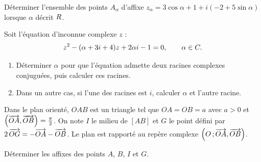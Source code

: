 \begin{annales}
Déterminer l'ensemble des points $A_{\alpha}$ d'affixe
$z_{\alpha} = 3\cos\alpha+1+i\left(-2+5\sin\alpha\right)$ lorsque $\alpha$
décrit $R$.

Soit l'équation d'inconnue complexe $z$ :
\[
  z^{2}-(\alpha+3i+4)z+2\alpha i-1 = 0, \qquad \alpha \in C .
\]
\begin{enumerate}[label=\textbf{\alph*)}, leftmargin=*, itemsep=0.15em]
  \item Déterminer $\alpha$ pour que l'équation admette deux racines
        complexes conjuguées, puis calculer ces racines.
  \item Dans un autre cas, si l'une des racines est $i$, calculer $\alpha$ et
        l'autre racine.
\end{enumerate}

Dans le plan orienté, $OAB$ est un triangle tel que $OA = OB = a$ avec $a>0$
et $\left(\overrightarrow{OA},\overrightarrow{OB}\right) = \frac{\pi}{2}$. On note $I$ le milieu
de $[AB]$ et $G$ le point défini par
$2\,\overrightarrow{OG} = -\overrightarrow{OA}-\overrightarrow{OB}$. Le plan est rapporté au repère
complexe $\left(O\,;\overrightarrow{OA},\overrightarrow{OB}\right)$.

Déterminer les affixes des points $A$, $B$, $I$ et $G$.
\end{annales}

